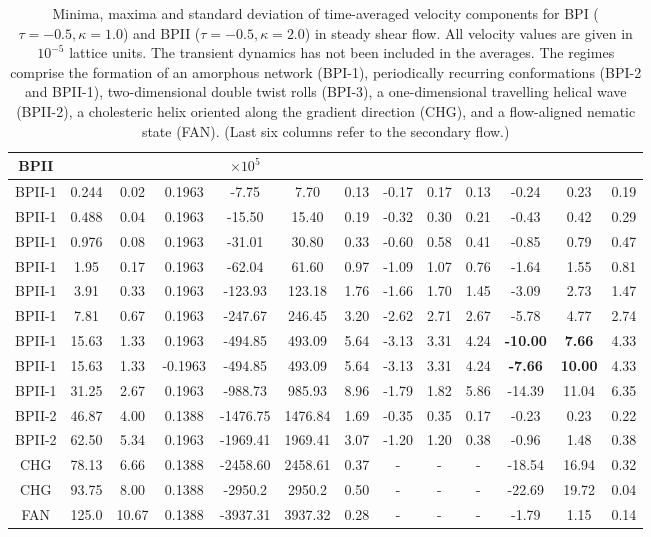 \documentclass[aps,pre,reprint,superscriptaddress, twocolumn]{revtex4}
\begin{document}
\begin{table}[htpb]
\begin{tabular}{|c||c|| c || c || c |c |c||c| c| c||c| c| c|}
BPII  & & & & $\times 10^5$ \\
\hline
BPII-1 & 0.244 &0.02 & 0.1963 &-7.75 &7.70 &0.13 &-0.17 &0.17 &0.13 &-0.24 &0.23 &0.19 \\
BPII-1 & 0.488 &0.04 & 0.1963 &-15.50 &15.40 &0.19 &-0.32 &0.30 &0.21 &-0.43 &0.42 &0.29 \\
BPII-1 & 0.976 &0.08 & 0.1963 &-31.01 &30.80 &0.33 &-0.60 &0.58 &0.41 &-0.85 &0.79 &0.47 \\
BPII-1 & 1.95 &0.17  & 0.1963 &-62.04  &61.60 & 0.97 & -1.09 &1.07 & 0.76 & -1.64 & 1.55 & 0.81\\
BPII-1 &3.91 & 0.33& 0.1963 &-123.93 &123.18 & 1.76 &-1.66 &1.70 & 1.45 &-3.09& 2.73 &1.47\\
BPII-1 &7.81 &0.67 & 0.1963  &-247.67 &246.45 & 3.20 &-2.62 &2.71 & 2.67 &-5.78 & 4.77 &2.74\\
BPII-1 &15.63 & 1.33& 0.1963 &-494.85 &493.09 & 5.64 &-3.13 &3.31 &4.24 &\bf{-10.00} & \bf{7.66} &4.33\\
BPII-1 & 15.63 & 1.33& -0.1963&-494.85 &493.09 & 5.64 & -3.13 &3.31 &4.24 &\bf{-7.66} & \bf{10.00} &4.33\\
BPII-1 & 31.25 &2.67 & 0.1963 &-988.73 &985.93 &8.96  &-1.79 &1.82 &5.86 &-14.39 & 11.04 &6.35\\
\hline
BPII-2 & 46.87 &4.00 & 0.1388 & -1476.75 & 1476.84 &1.69 &-0.35  &0.35  & 0.17 &-0.23 &0.23  & 0.22\\
BPII-2 & 62.50 & 5.34& 0.1963 & -1969.41  & 1969.41 & 3.07 & -1.20 & 1.20 & 0.38 &-0.96 & 1.48 &0.38 \\
\hline
CHG & 78.13 & 6.66 &  0.1388 &-2458.60 & 2458.61  &0.37 &- &- &- &-18.54 &16.94 &0.32 \\
CHG & 93.75 &8.00 & 0.1388 &-2950.2  &2950.2 &0.50 &- &- &- &-22.69 & 19.72 & 0.04\\
\hline
FAN & 125.0 &10.67 & 0.1388 &-3937.31  & 3937.32 &0.28 &-  &-  &-  &-1.79 &1.15  &0.14 \\
\hline
\end{tabular}
\caption{Minima, maxima and standard deviation of time-averaged velocity components 
for BPI ($\tau=-0.5, \kappa=1.0$) and BPII ($\tau=-0.5, \kappa=2.0$) in steady 
shear flow. All velocity values are given in $10^{-5}$ lattice units. The transient dynamics 
has not been included in the averages. The regimes comprise the formation
of an amorphous network (BPI-1), periodically recurring conformations (BPI-2 and BPII-1), 
two-dimensional double twist rolls (BPI-3), a one-dimensional travelling helical wave (BPII-2), 
a cholesteric helix oriented along the gradient direction (CHG), 
and a flow-aligned nematic state (FAN).
(Last six columns refer to the secondary flow.)}
\label{tab1}
\end{table}
\end{document}
